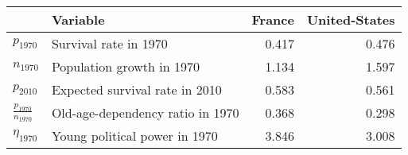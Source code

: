 
\begin{tabular}{llrr}
\toprule
\textbf{} & \textbf{Variable} & \textbf{France} & \textbf{United-States}\\
\midrule
$p_{1970}$ & Survival rate in 1970 & 0.417 & 0.476\\
$n_{1970}$ & Population growth in 1970 & 1.134 & 1.597\\
$p_{2010}$ & Expected survival rate in 2010 & 0.583 & 0.561\\
$\frac{p_{1970}}{n_{1970}}$ & Old-age-dependency ratio in 1970 & 0.368 & 0.298\\
$\eta_{1970}$ & Young political power in 1970 & 3.846 & 3.008\\
\bottomrule
\end{tabular}
